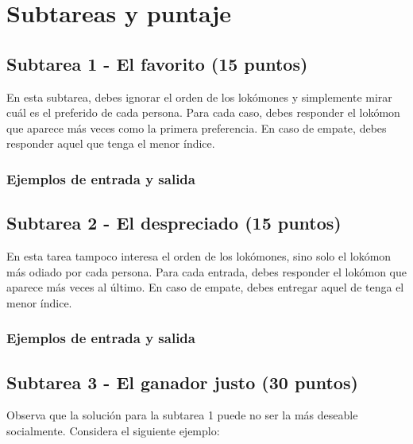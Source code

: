 \documentclass{oci}
\begin{document}
\newpage
\section*{Subtareas y puntaje}
\subsection*{Subtarea 1 - El favorito (15 puntos)}
En esta subtarea, debes ignorar el orden de los lokómones y simplemente
mirar cuál es el preferido de cada persona.
Para cada caso, debes responder el lokómon que aparece
más veces como la primera preferencia.
En caso de empate, debes responder aquel que tenga el menor índice. 

\renewenvironment{sampleDescription}{\subsubsection*{Ejemplos de entrada y salida}}{}

\begin{sampleDescription}
\end{sampleDescription}

\subsection*{Subtarea 2 - El despreciado (15 puntos)}

En esta tarea tampoco interesa el orden de los lokómones, sino solo el lokómon
más odiado por cada persona.
Para cada entrada, debes responder el lokómon que aparece más veces al último.
En caso de empate, debes entregar aquel de tenga el menor índice.

\begin{sampleDescription}
\end{sampleDescription}

\newpage
\subsection*{Subtarea 3 - El ganador justo (30 puntos)}

Observa que la solución para la subtarea 1 puede no ser la más deseable
socialmente.
Considera el siguiente ejemplo:
\end{document}
